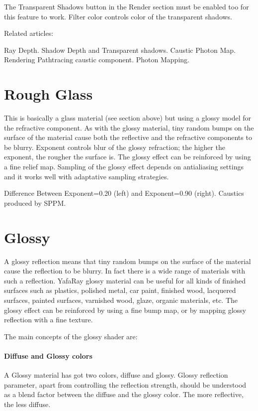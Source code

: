 The Transparent Shadows button in the Render section must be enabled too for this feature to work. Filter color controls color of the transparent shadows.

Related articles:

Ray Depth.
Shadow Depth and Transparent shadows.
Caustic Photon Map.
Rendering Pathtracing caustic component.
Photon Mapping.

\section{Rough Glass}

This is basically a glass material (see section above) but using a glossy model for the refractive component. As with the glossy material, tiny random bumps on the surface of the material cause both the reflective and the refractive components to be blurry. Exponent controls blur of the glossy refraction; the higher the exponent, the rougher the surface is. The glossy effect can be reinforced by using a fine relief map. Sampling of the glossy effect depends on antialiasing settings and it works well with adaptative sampling strategies.


Difference Between Exponent=0.20 (left) and Exponent=0.90 (right). Caustics produced by SPPM.

\section{Glossy}

A glossy reflection means that tiny random bumps on the surface of the material cause the reflection to be blurry. In fact there is a wide range of materials with such a reflection. YafaRay glossy material can be useful for all kinds of finished surfaces such as plastics, polished metal, car paint, finished wood, lacquered surfaces, painted surfaces, varnished wood, glaze, organic materials, etc. The glossy effect can be reinforced by using a fine bump map, or by mapping glossy reflection with a fine texture.

The main concepts of the glossy shader are:

\paragraph{Diffuse and Glossy colors}

A Glossy material has got two colors, diffuse and glossy. Glossy reflection parameter, apart from controlling the reflection strength, should be understood as a blend factor between the diffuse and the glossy color. The more reflective, the less diffuse.

